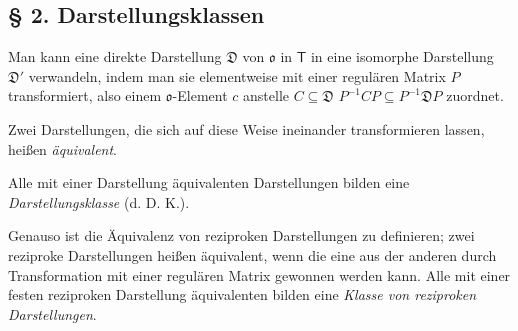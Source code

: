 \subsection*{§ 2. Darstellungsklassen}\label{darstellungsklassen}

Man kann eine direkte Darstellung \(\mathfrak D\) von \(\mathfrak{o}\) in \(\mathsf T\) in eine isomorphe Darstellung \(\mathfrak D'\) verwandeln, indem man sie elementweise mit einer regulären Matrix \(P\) transformiert, also einem \(\mathfrak{o}\)-Element \(c\) anstelle \(C\subseteq\mathfrak D\) \(P^{-1}CP\subseteq P^{-1}\mathfrak D P\) zuordnet.

Zwei Darstellungen, die sich auf diese Weise ineinander transformieren lassen, heißen \emph{äquivalent}.

Alle mit einer Darstellung äquivalenten Darstellungen bilden eine \emph{Darstellungsklasse} (d. D. K.).

Genauso ist die Äquivalenz von reziproken Darstellungen zu definieren; zwei reziproke Darstellungen heißen äquivalent, wenn die eine aus der anderen durch Transformation mit einer regulären Matrix gewonnen werden kann. Alle mit einer festen reziproken Darstellung äquivalenten bilden eine \emph{Klasse von reziproken Darstellungen}.
